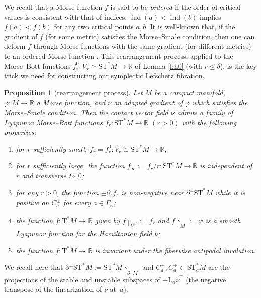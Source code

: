 \documentclass[JEP,XML,SOM,Unicode]{cedram}
\newcommand{\R}{{\mathbb R}}
\newcommand{\Crit}{\Gamma_{\!\varphi}}
\newcommand{\ind}{\operatorname{ind}}
\newcommand{\tu}[1]{\textup{#1}}
\newcommand{\sT}{\mathrm{T}^\ast}
\newcommand{\sST}{\mathrm{ST}^\ast}
\newcommand{\hnu}{\tilde\nu}
\newcommand{\cnu}{\bar\nu}
\def\Lnu_#1{{\mathrm L_#1\nu}}
\newcommand{\de}{\mathrel{:=}}
\newcommand{\rst}[1]{{\upharpoonright}_{\!#1}}
\let\del\partial
\let\on\colon
\theoremstyle{plain}
\newtheorem{proposition}[theorem]{Proposition}
\theoremstyle{definition}
\begin{document}
We recall that a Morse function $f$ is said to be \emph{ordered} if the order of
critical values is consistent with that of indices: $\ind(a) < \ind(b)$ implies
$f(a) < f(b)$ for any two critical points $a, b$. It is well-known that, if the
gradient of $f$ (for some metric) satisfies the Morse--Smale condition, then
one can deform $f$ through Morse functions with the same gradient (for different
metrics) to an ordered Morse function \cite[Th.\,B]{Sm}. This rearrangement
process, applied to the Morse--Bott functions $f_r^0 \on V_r \simeq \sST M \to
\R$ of Lemma \ref{l:h0} (with $r \le \delta$), is the key trick we need for
constructing our symplectic Lefschetz fibration.

\begin{proposition}[rearrangement process] \label{p:f}
Let $M$ be a compact manifold, \hbox{$\varphi \on M\!\to\! \R$} a Morse function, and
$\nu$ an adapted gradient of $\varphi$ which satisfies the Morse--Smale condition.
Then the contact vector field $\cnu$ admits a family of Lyapunov Morse--Bott
functions $f_r \on \sST M \to \R$ $(r>0)$ with the following properties\tu:
\begin{enumerate}
\item\label{p:f1}
for $r$ sufficiently small, $f_r = f_r^0 \on V_r \cong \sST M \to \R$\tu;
\item\label{p:f2}
for $r$ sufficiently large, the function $f_\infty \de f_r/r \on \sST M \to \R$
is independent of $r$ and transverse to~$0$\tu;
\item\label{p:f3}
for any $r>0$, the function $\pm\del_rf_r$ is non-negative near $\del^\pm\sST M$
while it is positive on $C_a^\pm$ for every $a \in \Crit$\tu;
\item\label{p:f4}
the function $f \on \sT M \to \R$ given by $f \rst{ V_r } \de f_r$ and $f \rst M
\de \varphi$ is a smooth Lyapunov function for the Hamiltonian field $\hnu$\tu;
\item\label{p:f5}
the function $f \on \sT M \to \R$ is invariant under the fiberwise antipodal
involution.
\end{enumerate}
\end{proposition}

We recall here that $\del^\pm \sST M \de \sST M \rst{ \del^\pm M }$ and $C_a^-,
C_a^+ \subset \sST_aM$ are the projections of the stable and unstable subspaces
of $-\Lnu_a^\top$ (the negative transpose of the linearization of $\nu$ at~$a$).
\end{document}
